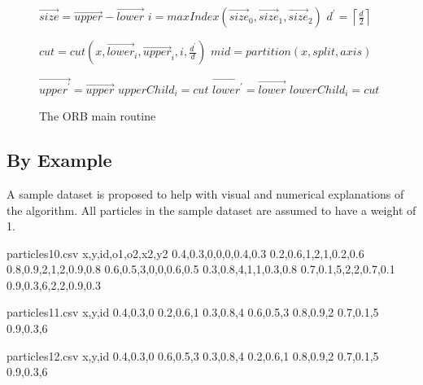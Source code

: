 \documentclass[]{article}
\begin{document}
\begin{figure}[H]
 	\begin{algorithmic}[1]
 		\State \Return	{}	
 		\EndIf
 		\State $\vec{size} = \vec{upper} - \vec{lower}$
 		\State $i = maxIndex(\vec{size}_0, \vec{size}_1, \vec{size}_2)$ 
 		\newline
 		\State $d^\prime = \left \lceil\frac{d}{2} \right \rceil$
 		
 		\State $cut = cut(x, \vec{lower}_{i}, \vec{upper}_{i}, i, \frac{d^\prime}{d} )$
 		\State $mid = partition(x, split, axis)$ 
 		\newline
 		
 		\State $\vec{upper^\prime} = \vec{upper}$
 		\State $upperChild_{i} = cut$
 		\State $\vec{lower^\prime} = \vec{lower}$
 		\State $lowerChild_{i} = cut$
 		\newline
 		
 		\State {} 
 		\State {}
 		\EndProcedure
 	\end{algorithmic}
 	\caption{The ORB main routine}\label{proc:orbmain}
\end{figure}



\subsection{By Example}

A sample dataset is proposed to help with visual and numerical explanations of the algorithm. All particles in the sample dataset are assumed to have a weight of 1.

\begin{filecontents*}{particles10.csv}
	x,y,id,o1,o2,x2,y2
	0.4,0.3,0,0,0,0.4,0.3
	0.2,0.6,1,2,1,0.2,0.6
	0.8,0.9,2,1,2,0.9,0.8
	0.6,0.5,3,0,0,0.6,0.5
	0.3,0.8,4,1,1,0.3,0.8
	0.7,0.1,5,2,2,0.7,0.1
	0.9,0.3,6,2,2,0.9,0.3
\end{filecontents*}

\begin{filecontents*}{particles11.csv}
	x,y,id
	0.4,0.3,0
	0.2,0.6,1
	0.3,0.8,4
	0.6,0.5,3
	0.8,0.9,2
	0.7,0.1,5
	0.9,0.3,6
\end{filecontents*}


\begin{filecontents*}{particles12.csv}
	x,y,id
	0.4,0.3,0
	0.6,0.5,3
	0.3,0.8,4
	0.2,0.6,1
	0.8,0.9,2
	0.7,0.1,5
	0.9,0.3,6
\end{filecontents*}
\end{document}
